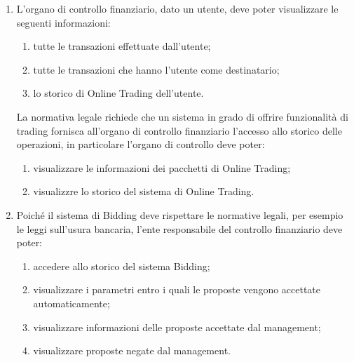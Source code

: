 \begin{enumerate}
	\item \label{itm:utente:dominio:controllo-finanziario} L'organo di controllo finanziario, dato un utente, deve poter visualizzare le seguenti informazioni:
        	\begin{enumerate}
	            \item tutte le transazioni effettuate dall'utente;
    	        \item tutte le transazioni che hanno l'utente come destinatario;
	            \item lo storico di Online Trading dell'utente.
    	    \end{enumerate}
	La normativa legale richiede che un sistema in grado di offrire funzionalit\`a di trading fornisca all'organo di controllo finanziario l'accesso allo storico delle operazioni, in particolare l'organo di controllo deve poter:
	\begin{enumerate}
    	\item visualizzare le informazioni dei pacchetti di Online Trading;
    	\item visualizzre lo storico del sistema di Online Trading.
	\end{enumerate}

	\item \label{itm:utente:dominio:controllo-finanziario:bidding} Poich\'e il sistema di Bidding deve rispettare le normative legali, per esempio le leggi sull'usura bancaria, l'ente responsabile del controllo finanziario deve poter:
	\begin{enumerate}
    	\item accedere allo storico del sistema Bidding;
    	\item visualizzare i parametri entro i quali le proposte vengono accettate automaticamente;
    	\item visualizzare informazioni delle proposte accettate dal management;
    	\item visualizzare proposte negate dal management.
	\end{enumerate}

\end{enumerate}





